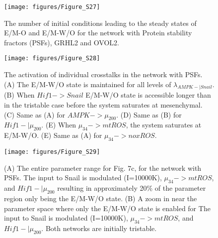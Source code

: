 \documentclass{article}
\begin{document}
\begin{figure}
\texttt{[image: figures/Figure\_S27]}
\caption{The number of initial conditions leading to the steady states of E/M-O and E/M-W/O for the network with Protein stability fractors (PSFs), GRHL2 and OVOL2.}
\end{figure}

\begin{figure}
\texttt{[image: figures/Figure\_S28]}
\caption{The activation of individual crosstalks in the network with PSFs. (A) The E/M-W/O state is maintained for all levels of $\lambda_{AMPK-|Snail}$. (B) When $Hif1-> Snail$ E/M-W/O state is accessible longer than in the tristable case before the system saturates at mesenchymal. (C) Same as (A) for $AMPK -> \mu_{200}$. (D) Same as (B) for $Hif1-| \mu_{200}$. (E) When $\mu_{34}->mtROS$, the system saturates at E/M-W/O. (E) Same as (A) for $\mu_{34}->noxROS$.}
\end{figure}

\begin{figure}
\texttt{[image: figures/Figure\_S29]}
\caption{(A) The entire parameter range for Fig. 7c, for the network with PSFs. The input to Snail is modulated (I=10000K), $\mu_{34}->mtROS$, and $Hif1-|\mu_{200}$ resulting in approximately 20\% of the parameter region only being the E/M-W/O state. (B) A zoom in near the parameter space where only the E/M-W/O state is enabled for The input to Snail is modulated (I=10000K), $\mu_{34}->mtROS$, and $Hif1-|\mu_{200}$. Both networks are initially tristable.}
\end{figure}


\FloatBarrier
\newpage

\end{document}

